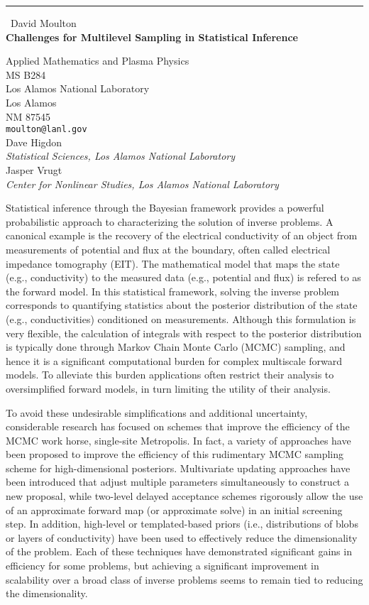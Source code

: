 \documentclass{report}
\begin{document}
\begin{center}
\rule{6in}{1pt} \
{\large David Moulton \\
{\bf Challenges for Multilevel Sampling in Statistical Inference}}

Applied Mathematics and Plasma Physics \\ MS B284 \\ Los Alamos National Laboratory \\ Los Alamos \\ NM 87545
\\
{\tt moulton@lanl.gov}\\
Dave Higdon\\
{\em Statistical Sciences, Los Alamos National Laboratory}\\
Jasper Vrugt\\
{\em Center for Nonlinear Studies, Los Alamos National Laboratory}\end{center}

Statistical inference through the Bayesian framework provides a
powerful probabilistic approach to characterizing the solution of
inverse problems. A canonical example is the recovery of the
electrical conductivity of an object from measurements of potential
and flux at the boundary, often called electrical impedance tomography
(EIT). The mathematical model that maps the state (e.g.,
conductivity) to the measured data (e.g., potential and flux) is
refered to as the forward model. In this statistical framework,
solving the inverse problem corresponds to quantifying statistics
about the posterior distribution of the state (e.g., conductivities)
conditioned on measurements. Although this formulation is very
flexible, the calculation of integrals with respect to the posterior
distribution is typically done through Markov Chain Monte Carlo (MCMC)
sampling, and hence it is a significant computational burden for
complex multiscale forward models. To alleviate this burden
applications often restrict their analysis to oversimplified forward
models, in turn limiting the utility of their analysis.

To avoid these undesirable simplifications and additional uncertainty,
considerable research has focused on schemes that improve the
efficiency of the MCMC work horse, single-site Metropolis. In fact, a
variety of approaches have been proposed to improve the efficiency of
this rudimentary MCMC sampling scheme for high-dimensional posteriors.
Multivariate updating approaches have been introduced that adjust
multiple parameters simultaneously to construct a new proposal, while
two-level delayed acceptance schemes rigorously allow the use of an
approximate forward map (or approximate solve) in an initial screening
step. In addition, high-level or templated-based priors (i.e.,
distributions of blobs or layers of conductivity) have been used to
effectively reduce the dimensionality of the problem. Each of these
techniques have demonstrated significant gains in efficiency for some
problems, but achieving a significant improvement in scalability over
a broad class of inverse problems seems to remain tied to reducing the
dimensionality.
\end{document}
